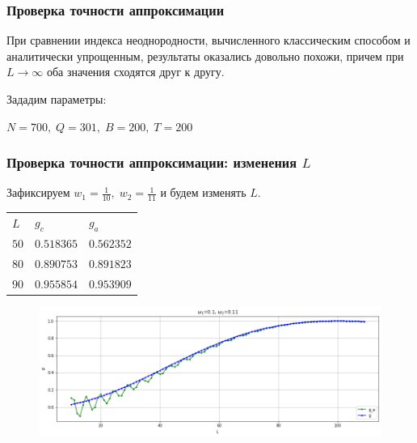 \documentclass[11pt]{beamer}
\begin{document}
	\begin{frame}
		\frametitle{Проверка точности аппроксимации}
		При сравнении индекса неоднородности, вычисленного классическим способом и аналитически упрощенным, результаты оказались довольно похожи, причем при $ L \rightarrow \infty $ оба значения сходятся друг к другу.
		
		\bigskip
		\bigskip
		Зададим параметры:
		
		$ N = 700,\; Q = 301,\; B = 200,\; T = 200 $
		
	\end{frame}

	\begin{frame}
		\frametitle{Проверка точности аппроксимации: изменения $ L $}
		Зафиксируем $ w_1 = \frac{1}{10},\; w_2 = \frac{1}{11} $ и будем изменять $ L $.
		
		\begin{table}[!hhh]
			\centering
			\small
			\begin{tabular}{lll}
				$ L $  & $ g_c $     & $ g_a $       \\
				$ 50 $ & $ 0.518365 $ & $ 0.562352 $ \\
				$ 80 $ & $ 0.890753 $ & $ 0.891823 $ \\
				$ 90 $ & $ 0.955854 $ & $ 0.953909 $
			\end{tabular}
		\end{table}
		
		\begin{figure}[b]
			\centering
			\includegraphics[width=\linewidth]{imgs/dynamics_L}
		\end{figure}
		
	\end{frame}
\end{document}

